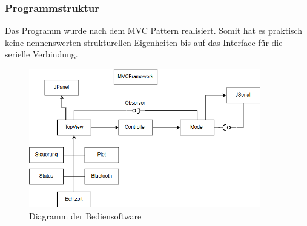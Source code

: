\subsubsection*{Programmstruktur}

Das Programm wurde nach dem MVC Pattern realisiert. Somit hat es praktisch keine nennenswerten strukturellen Eigenheiten bis auf das Interface für die serielle Verbindung. 

\begin{figure}[H]
\begin{center}
\includegraphics[width=0.9\textwidth]{images/Software_UML.png}
\caption{Diagramm der Bediensoftware}
\end{center}
\end{figure}
